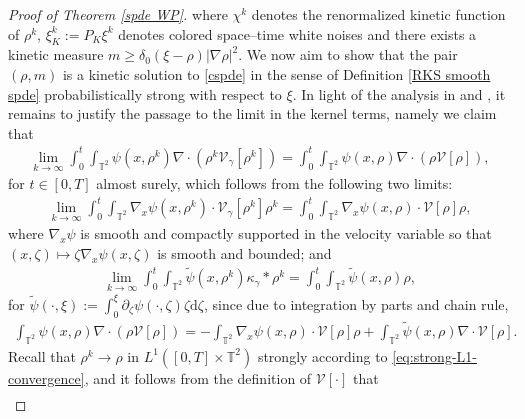 \begin{proof}[Proof of Theorem \ref{spde WP}]
where $\chi^k$ denotes the renormalized kinetic function of $\rho^k$, $\xi^k_K := P_K \xi^k$ denotes colored space--time white noises and there exists a kinetic measure $m \geq\delta_0(\xi - \rho) |\nabla \rho|^2$.  We now aim to show that the pair $(\rho, m)$ is a kinetic solution to \eqref{cspde} in the sense of Definition \ref{RKS smooth spde} probabilistically strong with respect to $\xi$. In light of the analysis in \cite[Theorem 5.5]{FG24} and \cite[Theorem 6.3]{WWZ22}, it remains to justify the passage to the limit in the kernel terms, namely we claim that 
\begin{align}\label{eq:claim-convergence-kernel-kinetic}
\lim_{k \to \infty}\int_{0}^{t} \int_{\mathbb{T}^2} \psi(x, \rho^k) \nabla \cdot\left(\rho^k \mathcal{V}_{\gamma}[\rho^k]\right) = \int_{0}^{t} \int_{\mathbb{T}^2} \psi(x, \rho) \nabla \cdot\left(\rho \mathcal{V}[\rho]\right),
\end{align}
for $t \in [0,T]$ almost surely, which follows from the following two limits:
\begin{align}\label{eq:conv-kinetic-interaction1}
\lim_{k \to \infty}\int_{0}^{t} \int_{\mathbb{T}^2} \nabla_x\psi(x, \rho^k)  \cdot \mathcal{V}_{\gamma}[\rho^k] \rho^k  = \int_{0}^{t} \int_{\mathbb{T}^2} \nabla_x\psi(x, \rho)  \cdot \mathcal{V}[\rho] \rho,
\end{align}
where $\nabla_x \psi$ is smooth and compactly supported in the velocity variable so that $(x, \zeta) \mapsto \zeta \nabla_x \psi(x,\zeta)$ is smooth and bounded; and 
\begin{align}\label{eq:conv-kinetic-interaction2}
\lim_{k \to \infty}\int_{0}^{t} \int_{\mathbb{T}^2} \tilde{\psi}(x, \rho^k)  \kappa_{\gamma} \ast \rho^k  = \int_{0}^{t} \int_{\mathbb{T}^2}  \tilde{\psi}(x, \rho)  \rho,
\end{align}
for $\tilde{\psi}(\cdot, \xi):= \int_0^{\xi} \partial_{\zeta}\psi(\cdot,\zeta) \zeta\mathrm{d}\zeta$, since due to integration by parts and chain rule, 
\begin{align*}
\int_{\mathbb{T}^2} \psi(x, \rho) \nabla \cdot\left(\rho \mathcal{V}[\rho]\right) = -\int_{\mathbb{T}^2} \nabla_x\psi(x, \rho) \cdot \mathcal{V}[\rho] \rho + \int_{\mathbb{T}^2} \tilde{\psi}(x, \rho) \nabla\cdot \mathcal{V}[\rho].
\end{align*}
Recall that $\rho^k \to \rho$ in $L^1([0,T]\times\mathbb{T}^2)$ strongly according to \eqref{eq:strong-L1-convergence}, and it follows from the definition of $\mathcal{V}[\cdot]$ that 
\begin{align}\label{eq:cor-conv-L1L1}

\end{align}
\end{proof}
